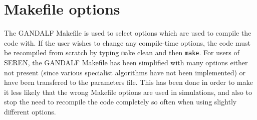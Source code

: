 \documentclass[a4paper]{article}
\newcommand{\var}[1]{\texttt{#1}}
\begin{document}
\newpage



\section{Makefile options} \label{S:MAKEFILE}
The GANDALF Makefile is used to select options which are used to compile the code with.  If the user wishes to change any compile-time options, the code must be recompiled from scratch by typing {\var make clean} and then \var{make}.  For users of SEREN, the GANDALF Makefile has been simplified with many options either not present (since various specialist algorithms have not been implemented) or have been transfered to the parameters file.  This has been done in order to make it less likely that the wrong Makefile options are used in simulations, and also to stop the need to recompile the code completely so often when using slightly different options.
\end{document}
